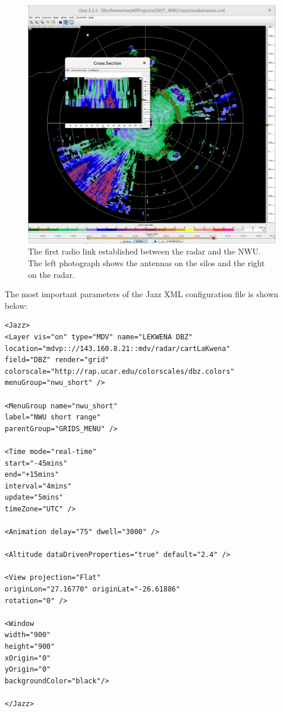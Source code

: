 \documentclass{wrcreport}
\begin{document}
\begin{figure}[!htp]
\includegraphics[width=\textwidth]{jazz-example2.png}
  \caption[The first radio link established between the radar and the
  NWU.]{The first radio link established between the radar and the
  NWU. The left photograph shows the antennas on the silos and the
  right on the radar.}
\label{fig:jazz}
\end{figure}

The most important parameters of the Jazz XML configuration file is
shown below:

\begin{verbatim}
<Jazz>
<Layer vis="on" type="MDV" name="LEKWENA DBZ"
location="mdvp:://143.160.8.21::mdv/radar/cartLaKwena"
field="DBZ" render="grid" 
colorscale="http://rap.ucar.edu/colorscales/dbz.colors"
menuGroup="nwu_short" />

<MenuGroup name="nwu_short" 
label="NWU short range" 
parentGroup="GRIDS_MENU" />

<Time mode="real-time" 
start="-45mins" 
end="+15mins" 
interval="4mins" 
update="5mins" 
timeZone="UTC" />

<Animation delay="75" dwell="3000" />

<Altitude dataDrivenProperties="true" default="2.4" />

<View projection="Flat" 
originLon="27.16770" originLat="-26.61886" 
rotation="0" />

<Window 
width="900" 
height="900" 
xOrigin="0" 
yOrigin="0" 
backgroundColor="black"/>

</Jazz>
\end{verbatim}
\end{document}
